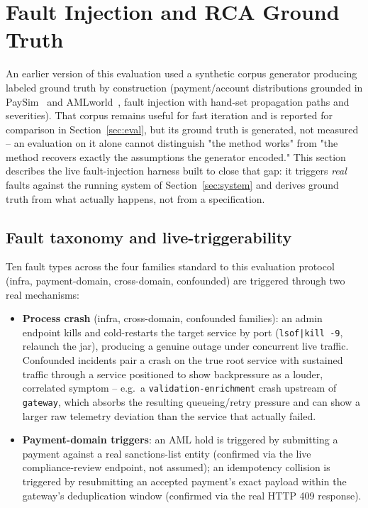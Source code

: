 \documentclass[conference]{IEEEtran}
\begin{document}
\section{Fault Injection and RCA Ground Truth}
\label{sec:faults}

An earlier version of this evaluation used a synthetic corpus generator
producing labeled ground truth by construction (payment/account
distributions grounded in PaySim~\cite{paysim2016} and
AMLworld~\cite{amlworld2023}, fault injection with hand-set propagation
paths and severities). That corpus remains useful for fast iteration and is
reported for comparison in Section~\ref{sec:eval}, but its ground truth is
generated, not measured -- an evaluation on it alone cannot distinguish "the
method works" from "the method recovers exactly the assumptions the
generator encoded." This section describes the live fault-injection
harness built to close that gap: it triggers \emph{real} faults against the
running system of Section~\ref{sec:system} and derives ground truth from
what actually happens, not from a specification.

\subsection{Fault taxonomy and live-triggerability}
Ten fault types across the four families standard to this evaluation
protocol (infra, payment-domain, cross-domain, confounded) are triggered
through two real mechanisms:

\begin{itemize}
  \item \textbf{Process crash} (infra, cross-domain, confounded families):
  an admin endpoint kills and cold-restarts the target service by port
  (\texttt{lsof|kill -9}, relaunch the jar), producing a genuine outage
  under concurrent live traffic. Confounded incidents pair a crash on the
  true root service with sustained traffic through a service positioned to
  show backpressure as a louder, correlated symptom -- e.g.\ a
  \texttt{validation-enrichment} crash upstream of \texttt{gateway}, which
  absorbs the resulting queueing/retry pressure and can show a larger raw
  telemetry deviation than the service that actually failed.
  \item \textbf{Payment-domain triggers}: an AML hold is triggered by
  submitting a payment against a real sanctions-list entity (confirmed via
  the live compliance-review endpoint, not assumed); an idempotency
  collision is triggered by resubmitting an accepted payment's exact
  payload within the gateway's deduplication window (confirmed via the
  real HTTP 409 response).
\end{itemize}
\end{document}
